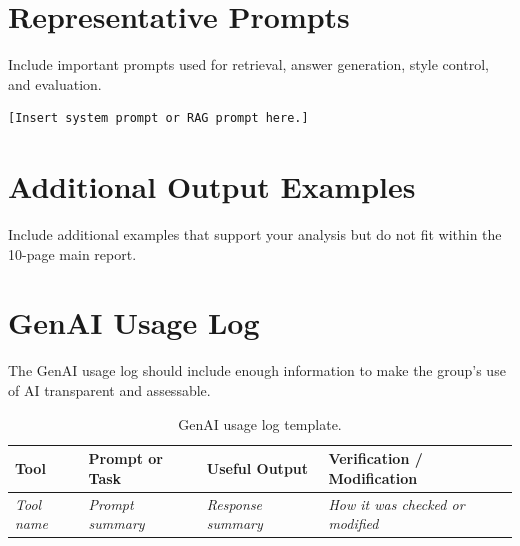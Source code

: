 \documentclass[10pt,conference]{IEEEtran}
\begin{document}
\section{Representative Prompts}
\label{app:prompts}

Include important prompts used for retrieval, answer generation, style control, and evaluation.

\begin{verbatim}
[Insert system prompt or RAG prompt here.]
\end{verbatim}

\section{Additional Output Examples}
\label{app:outputs}

Include additional examples that support your analysis but do not fit within the 10-page main report.

\section{GenAI Usage Log}
\label{app:genai-log}

The GenAI usage log should include enough information to make the group's use of AI transparent and assessable.

\begin{table}[h]
\centering
\caption{GenAI usage log template.}
\label{tab:genai-log}
\begin{tabularx}{\textwidth}{p{2.2cm} p{3.0cm} p{3.0cm} X}
\toprule
Tool & Prompt or Task & Useful Output & Verification / Modification \\
\midrule
\emph{Tool name} & \emph{Prompt summary} & \emph{Response summary} & \emph{How it was checked or modified} \\
\bottomrule
\end{tabularx}
\end{table}
\end{document}

